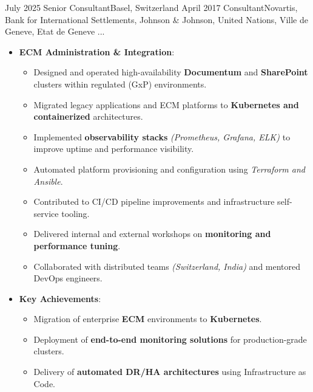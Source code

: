 
\begin{experiences}

\consultantexperience
    {July 2025} {Senior Consultant}{}{Basel, Switzerland}
    {April 2017}    {Consultant}{Novartis, Bank for International Settlements, Johnson \& Johnson, United Nations, Ville de Geneve, Etat de Geneve ...} {
        \begin{itemize}[left=0pt,label={},itemsep=0.5em]

          \item \textbf{ECM Administration \& Integration}:
            \begin{itemize}[itemsep=0.2em,topsep=0.2em,parsep=0pt]
              \small
              \item Designed and operated high-availability \textbf{Documentum} and \textbf{SharePoint} clusters within regulated (GxP) environments.
              \item Migrated legacy applications and ECM platforms to \textbf{Kubernetes and containerized} architectures.
              \item Implemented \textbf{observability stacks} \emph{(Prometheus, Grafana, ELK)} to improve uptime and performance visibility.
              \item Automated platform provisioning and configuration using \emph{Terraform and Ansible}.
              \item Contributed to CI/CD pipeline improvements and infrastructure self-service tooling.
              \item Delivered internal and external workshops on \textbf{monitoring and performance tuning}.
              \item Collaborated with distributed teams \emph{(Switzerland, India)} and mentored DevOps engineers.
            \end{itemize}

          \item \textbf{Key Achievements}:
            \begin{itemize}[itemsep=0.2em,topsep=0.2em,parsep=0pt]
              \small
              \item Migration of enterprise \textbf{ECM} environments to \textbf{Kubernetes}.
              \item Deployment of \textbf{end-to-end monitoring solutions} for production-grade clusters.
              \item Delivery of \textbf{automated DR/HA architectures} using Infrastructure as Code.
            \end{itemize}


\end{itemize}}
\end{experiences}
